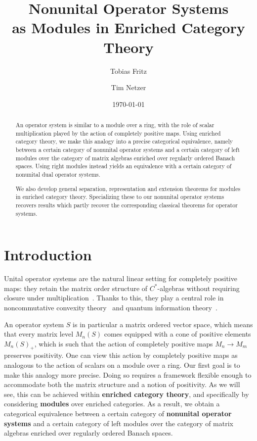 \documentclass[11pt,onecolumn]{article}
\title{Nonunital Operator Systems\\ as Modules in Enriched Category Theory}
\author{Tobias Fritz}
\author{Tim Netzer}
\affil{\small Department of Mathematics, University of Innsbruck, Austria}
\date{\today}
\theoremstyle{plain}
\theoremstyle{remark}
\theoremstyle{definition}
\begin{document}
\maketitle

\begin{abstract}
	An operator system is similar to a module over a ring, with the role of scalar multiplication played by the action of completely positive maps.
	Using enriched category theory, we make this analogy into a precise categorical equivalence,
	namely between a certain category of nonunital operator systems and a certain category of left modules over the category of matrix algebras
	enriched over regularly ordered Banach spaces.
	Using right modules instead yields an equivalence with a certain category of nonunital dual operator systems.

	We also develop general separation, representation and extension theorems for modules in enriched category theory.
	Specializing these to our nonunital operator systems recovers results which partly recover the corresponding classical theorems for operator systems.
\end{abstract}

\begingroup
\linespread{0.95}\selectfont
\setlength{\parskip}{0pt}
\vspace{0.5em}
\tableofcontents
\endgroup
\restoregeometry


\section{Introduction}

Unital operator systems are the natural linear setting for completely positive maps:
they retain the matrix order structure of $C^*$-algebras without requiring closure under multiplication~\cite{Paulsen}.
Thanks to this, they play a central role in noncommutative convexity theory~\cite{WebsterWinklerOperatorConvexity,KennedyKimManorNonunital}
and quantum information theory~\cite{GuptaMandayamSunderQuantumInformation,DeLasCuevasNetzerWonderland}.

An operator system $S$ is in particular a matrix ordered vector space, which means that every matrix level $M_n(S)$ comes equipped with a cone of positive elements $M_n(S)_+$,
which is such that the action of completely positive maps $M_n \to M_m$ preserves positivity.
One can view this action by completely positive maps as analogous to the action of scalars on a module over a ring.
Our first goal is to make this analogy more precise.
Doing so requires a framework flexible enough to accommodate both the matrix structure and a notion of positivity.
As we will see, this can be achieved within \textbf{enriched category theory},
and specifically by considering \textbf{modules} over enriched categories.
As a result, we obtain a categorical equivalence between a certain category of \textbf{nonunital operator systems} 
and a certain category of left modules over the category of matrix algebras enriched over regularly ordered Banach spaces.
\end{document}
